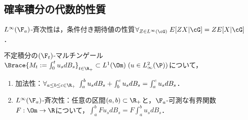 \documentclass[uplatex,dvipdfmx]{jsreport}
\begin{document}
\subsection{確率積分の代数的性質}

\begin{tcolorbox}[colframe=ForestGreen, colback=ForestGreen!10!white,breakable,colbacktitle=ForestGreen!40!white,coltitle=black,fonttitle=\bfseries\sffamily,
title=]
    $L^\infty(\F_a)$-斉次性は，条件付き期待値の性質$\forall_{Z\in L^\infty(\cG)}\;E[ZX|\cG]=ZE[X|\cG]$．
\end{tcolorbox}

\begin{proposition}[代数法則]\label{prop-algebraic-property-of-indefinite-integral-process}
    不定積分の$(\F_t)$-マルチンゲール$\Brace{M_t:=\int^t_0 u_sdB_s}_{t\in\R_+}\subset L^1(\Om)\;(u\in L^2_\infty(\P))$について，
    \begin{enumerate}
        \item 加法性：$\forall_{a\le b\le c\in\R_+}\;\int^b_au_sdB_s+\int^c_bu_sdB_s=\int^c_au_sdB_s$．
        \item $L^\infty(\F_a)$-斉次性：任意の区間$(a,b)\subset\R_+$と，$\F_a$-可測な有界関数$F:\Om\to\R$について，$\int^b_aFu_sdB_s=F\int^b_au_sdB_s$．
    \end{enumerate}
\end{proposition}
\end{document}
